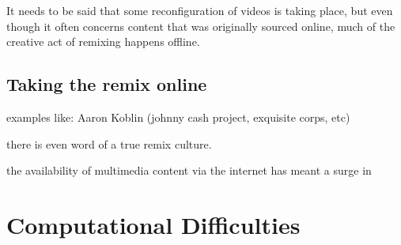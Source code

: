 It needs to be said that some reconfiguration of videos is taking place, but even though it often concerns content that was originally sourced online, much of the creative act of remixing happens offline.


\subsection{Taking the remix online}

examples like: Aaron Koblin (johnny cash project, exquisite corps, etc)

there is even word of a true remix culture.

the availability of multimedia content via the internet has meant a surge in 


\section{Computational Difficulties}







